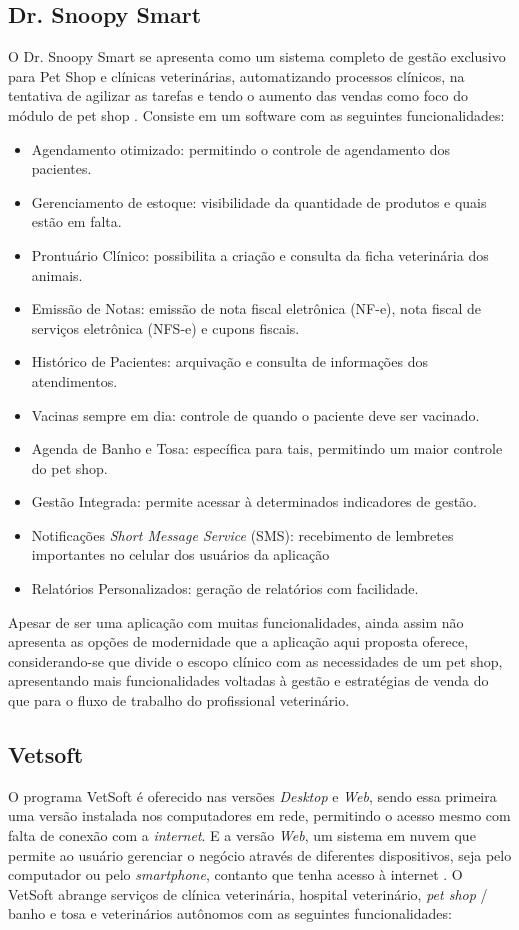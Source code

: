 \documentclass[
    12pt,               %
    openright,          %
    oneside,
    a4paper,            %
    BIBLATEX,           %
    TODO,               %
    english,            %
    brazil              %
    ]{ifsp-spo-inf-ctds}
\begin{document}
        \subsection{Dr. Snoopy Smart}
        O Dr. Snoopy Smart se apresenta como um sistema completo de gestão exclusivo para Pet Shop e clínicas veterinárias, automatizando processos clínicos, na tentativa de agilizar as tarefas e tendo o aumento das vendas como foco do módulo de pet shop . Consiste em um software com as seguintes funcionalidades:

\begin{itemize}
    \item Agendamento otimizado: permitindo o controle de agendamento dos pacientes.
    \item Gerenciamento de estoque: visibilidade da quantidade de produtos e quais estão em falta.
    \item Prontuário Clínico: possibilita a criação e consulta da ficha veterinária dos animais.
    \item Emissão de Notas: emissão de nota fiscal eletrônica (NF-e), nota fiscal de serviços eletrônica (NFS-e) e cupons fiscais.
    \item Histórico de Pacientes: arquivação e consulta de informações dos atendimentos. 
    \item Vacinas sempre em dia: controle de quando o paciente deve ser vacinado.
    \item Agenda de Banho e Tosa: específica para tais, permitindo um maior controle do pet shop.
    \item Gestão Integrada: permite acessar à determinados indicadores de gestão.
    \item Notificações \emph{Short Message Service} (SMS): recebimento de lembretes importantes no celular dos usuários da aplicação
    \item Relatórios Personalizados: geração de relatórios com facilidade.
\end{itemize}

    Apesar de ser uma aplicação com muitas funcionalidades, ainda assim não apresenta as opções de modernidade que a aplicação aqui proposta oferece, considerando-se que divide o escopo clínico com as necessidades de um pet shop, apresentando mais funcionalidades voltadas à gestão e estratégias de venda do que para o fluxo de trabalho do profissional veterinário.

        \subsection{Vetsoft}
        O programa VetSoft é oferecido nas versões \emph{Desktop} e \emph{Web}, sendo essa primeira uma versão instalada nos computadores em rede, permitindo o acesso mesmo com falta de conexão com a \emph{internet}. E a versão \emph{Web}, um sistema em nuvem que permite ao usuário gerenciar o negócio através de diferentes dispositivos, seja pelo computador ou pelo \emph{smartphone}, contanto que tenha acesso à internet . O VetSoft abrange serviços de clínica veterinária, hospital veterinário, \emph{pet shop} / banho e tosa e veterinários autônomos com as seguintes funcionalidades:
\end{document}
